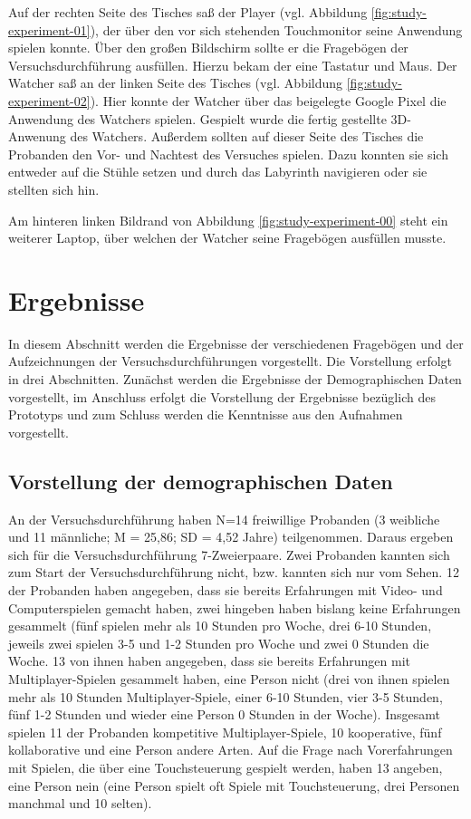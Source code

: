 Auf der rechten Seite des Tisches saß der Player (vgl. Abbildung \ref{fig:study-experiment-01}), der über den vor sich stehenden Touchmonitor seine Anwendung spielen konnte. Über den großen Bildschirm sollte er die Fragebögen der Versuchsdurchführung ausfüllen. Hierzu bekam der eine Tastatur und Maus. Der Watcher saß an der linken Seite des Tisches (vgl. Abbildung \ref{fig:study-experiment-02}). Hier konnte der Watcher über das beigelegte Google Pixel die Anwendung des Watchers spielen. Gespielt wurde die fertig gestellte \ac{3D}-Anwenung des Watchers. Außerdem sollten auf dieser Seite des Tisches die Probanden den Vor- und Nachtest des Versuches spielen. Dazu konnten sie sich entweder auf die Stühle setzen und durch das Labyrinth navigieren oder sie stellten sich hin.

Am hinteren linken Bildrand von Abbildung \ref{fig:study-experiment-00} steht ein weiterer Laptop, über welchen der Watcher seine Fragebögen ausfüllen musste.

\section{Ergebnisse}
In diesem Abschnitt werden die Ergebnisse der verschiedenen Fragebögen und der Aufzeichnungen der Versuchsdurchführungen vorgestellt.
Die Vorstellung erfolgt in drei Abschnitten. Zunächst werden die Ergebnisse der Demographischen Daten vorgestellt, im Anschluss erfolgt die Vorstellung der Ergebnisse bezüglich des Prototyps und zum Schluss werden die Kenntnisse aus den Aufnahmen vorgestellt.

\subsection{Vorstellung der demographischen Daten}
An der Versuchsdurchführung haben N=14 freiwillige Probanden (3 weibliche und 11 männliche; M = 25,86; SD = 4,52 Jahre) teilgenommen. Daraus ergeben sich für die Versuchsdurchführung 7-Zweierpaare. Zwei Probanden kannten sich zum Start der Versuchsdurchführung nicht, bzw. kannten sich nur vom Sehen. 12 der Probanden haben angegeben, dass sie bereits Erfahrungen mit Video- und Computerspielen gemacht haben, zwei hingeben haben bislang keine Erfahrungen gesammelt (fünf spielen mehr als 10 Stunden pro Woche, drei 6-10 Stunden, jeweils zwei spielen 3-5 und 1-2 Stunden pro Woche und zwei 0 Stunden die Woche. 13 von ihnen haben angegeben, dass sie bereits Erfahrungen mit Multiplayer-Spielen gesammelt haben, eine Person nicht (drei von ihnen spielen mehr als 10 Stunden Multiplayer-Spiele, einer 6-10 Stunden, vier 3-5 Stunden, fünf 1-2 Stunden und wieder eine Person 0 Stunden in der Woche). Insgesamt spielen 11 der Probanden kompetitive Multiplayer-Spiele, 10 kooperative, fünf kollaborative und eine Person andere Arten.
Auf die Frage nach Vorerfahrungen mit Spielen, die über eine Touchsteuerung gespielt werden, haben 13  angeben, eine Person nein (eine Person spielt oft Spiele mit Touchsteuerung, drei Personen manchmal und  10 selten).

